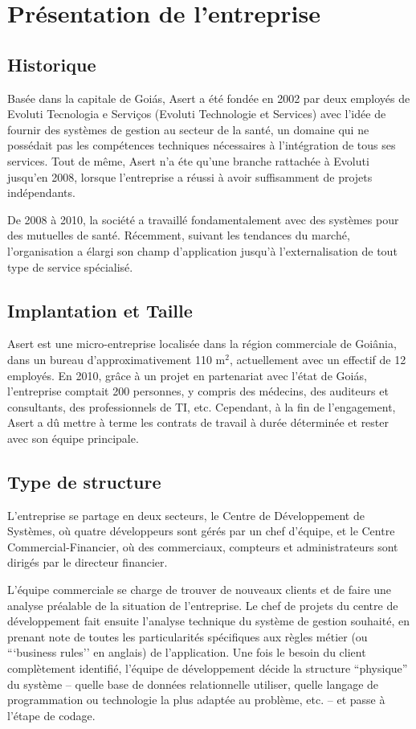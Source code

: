 \chapter{Présentation de l’entreprise}
\section{Historique}

Basée dans la capitale de Goiás, Asert a été fondée en 2002 par deux employés de Evoluti Tecnologia e Serviços (Evoluti Technologie et Services) avec l'idée de fournir des systèmes de gestion au secteur de la santé, un domaine qui ne possédait pas les compétences techniques nécessaires à l'intégration de tous ses services. Tout de même, Asert n'a éte qu'une branche rattachée à Evoluti jusqu'en 2008, lorsque l'entreprise a réussi à avoir suffisamment de projets indépendants.

De 2008 à 2010, la société a travaillé fondamentalement avec des systèmes pour des mutuelles de santé. Récemment, suivant les tendances du marché, l'organisation a élargi son champ d'application jusqu'à l'externalisation de tout type de service spécialisé.

\section{Implantation et Taille}

Asert est une micro-entreprise localisée dans la région commerciale de Goiânia, dans un bureau d'approximativement 110 m$^2$, actuellement avec un effectif de 12 employés. En 2010, grâce à un projet en partenariat avec l'état de Goiás, l'entreprise comptait 200 personnes, y compris des médecins, des auditeurs et consultants, des professionnels de TI, etc. Cependant, à la fin de l'engagement, Asert a dû mettre à terme les contrats de travail à durée déterminée et rester avec son équipe principale.

\section{Type de structure}

L'entreprise se partage en deux secteurs, le Centre de Développement de Systèmes, où quatre développeurs sont gérés par un chef d'équipe, et le Centre Commercial-Financier, où des commerciaux, compteurs et administrateurs sont dirigés par le directeur financier.

L'équipe commerciale se charge de trouver de nouveaux clients et de faire une analyse préalable de la situation de l'entreprise. Le chef de projets du centre de développement fait ensuite l'analyse technique du système de gestion souhaité, en prenant note de toutes les particularités spécifiques aux règles métier (ou ```business rules'' en anglais) \cite{regle-metier} de l'application. Une fois le besoin du client complètement identifié, l'équipe de développement décide la structure ``physique'' du système -- quelle base de données relationnelle utiliser, quelle langage de programmation ou technologie la plus adaptée au problème, etc. -- et passe à l'étape de codage.

